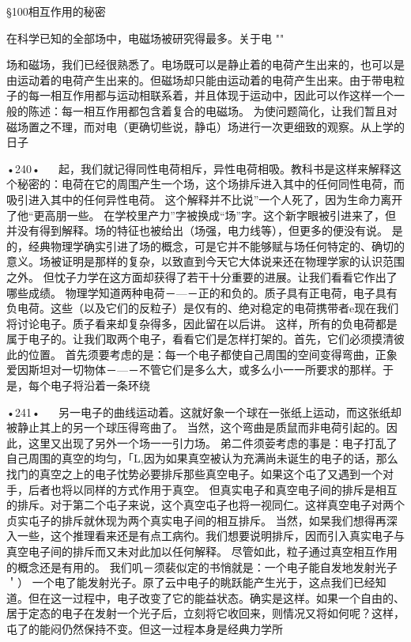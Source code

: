 §100相互作用的秘密

在科学已知的全部场中，电磁场被研究得最多。关于电
""

场和磁场，我们已经很熟悉了。电场既可以是静止着的电荷产生出来的，也可以是由运动着的电荷产生出来的。但磁场却只能由运动着的电荷产生出来。由于带电粒子的每一相互作用都与运动相联系着，并且体现于运动中，因此可以作这样一个一般的陈述：每一相互作用都包含着复合的电磁场。
为使问题简化，让我们暂且对磁场置之不理，而对电（更确切些说，静屯）场进行一次更细致的观察。从上学的日子

•240•
  
起，我们就记得同性电荷相斥，异性电荷相吸。教科书是这样来解释这个秘密的：电荷在它的周围产生一个场，这个场排斥进入其中的任何同性电荷，而吸引进入其中的任何异性电荷。
这个解释并不比说”一个人死了，因为生命力离开了他“更高朋一些。
在学校里产力”字被换成“场”字。这个新字眼被引进来了，但并没有得到解释。场的特征也被给出（场强，电力线等），但更多的便没有说。
是的，经典物理学确实引进了场的概念，可是它并不能够赋与场任何特定的、确切的意义。场被证明是那样的复杂，以致直到今天它大体说来还在物理学家的认识范围之外。
但忱子力学在这方面却获得了若干十分重要的进展。让我们看看它作出了哪些成绩。
物理学知道两种电荷－—－正的和负的。质子具有正电荷，电子具有负电荷。这些（以及它们的反粒子）是仅有的、绝对稳定的电荷携带者e现在我们将讨论电子。质子看来却复杂得多，因此留在以后讲。
这样，所有的负电荷都是属于电子的。让我们取两个电子，看看它们是怎样打架的。首先，它们必须摸清彼此的位置。
首先须要考虑的是：每一个电子都使自己周围的空间变得弯曲，正象爱因斯坦对一切物体－—－不管它们是多么大，或多么小一一所要求的那样。于是，每个电子将沿着一条环绕

•241•
  
另一电子的曲线运动着。这就好象一个球在一张纸上运动，而这张纸却被静止其上的另一个球压得弯曲了。
当然，这个弯曲是质鼠而非电荷引起的。因此，这里又出现了另外一个场一一引力场。
弟二件须荌考虑的事是：电子打乱了自己周围的真空的均匀，「L,因为如果真空被认为充满尚未诞生的电子的话，那么找门的真空之上的电子忱势必要排斥那些真空电子。如果这个屯了又遇到一个对手，后者也将以同样的方式作用于真空。
但真实电子和真空电子间的排斥是相互的排斥。对于第二个屯子来说，这个真空屯子也将一视同仁。这祥真空电子对两个贞实屯子的排斥就休现为两个真实电子间的相互排斥。
当然，如杲我们想得再深入一些，这个推理看来还是有点工病彴。我们想要说明排斥，因而引入真实电子与真空电子间的排斥而又未对此加以任何解释。
尽管如此，粒子通过真空相互作用的概念还是有用的。
我们叽－须裴似定的书悄就是：一个电子能自发地发射光子＇）
一个电了能发射光子。原了云中电子的眺跃能产生光于，这点我们已经知道。但在这一过程中，电子改变了它的能益状态。确实是这样。如果一个自由的、居于定态的电子在发射一个光子后，立刻将它收回来，则情况又将如何呢？这样，屯了的能闷仍然保持不变。但这一过程本身是经典力学所

